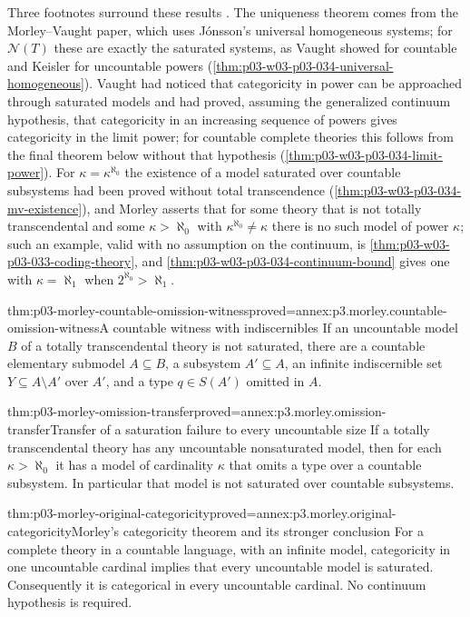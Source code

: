 Three footnotes surround these results \cite[p.~535, nn.~22--24]{Morley1965}.
The uniqueness theorem comes from the Morley--Vaught paper, which uses
Jónsson's universal homogeneous systems; for \(\mathcal N(T)\) these are
exactly the saturated systems, as Vaught showed for countable and Keisler
for uncountable powers (\cref{thm:p03-w03-p03-034-universal-homogeneous}).
Vaught had noticed that categoricity in power can be approached through
saturated models and had proved, assuming the generalized continuum
hypothesis, that categoricity in an increasing sequence of powers gives
categoricity in the limit power; for countable complete theories this
follows from the final theorem below without that hypothesis
(\cref{thm:p03-w03-p03-034-limit-power}). For \(\kappa=\kappa^{\aleph_0}\)
the existence of a model saturated over countable subsystems had been
proved without total transcendence
(\cref{thm:p03-w03-p03-034-mv-existence}), and Morley asserts that for
some theory that is not totally transcendental and some \(\kappa>\aleph_0\)
with \(\kappa^{\aleph_0}\neq\kappa\) there is no such model of power
\(\kappa\); such an example, valid with no assumption on the continuum,
is \cref{thm:p03-w03-p03-033-coding-theory}, and
\cref{thm:p03-w03-p03-034-continuum-bound} gives one with
\(\kappa=\aleph_1\) when \(2^{\aleph_0}>\aleph_1\).

\begin{hblemma}{thm:p03-morley-countable-omission-witness}{proved=annex:p3.morley.countable-omission-witness}{A countable witness with indiscernibles}
If an uncountable model \(B\) of a totally transcendental theory
is not saturated, there are a countable elementary submodel
\(A\subseteq B\), a subsystem \(A'\subseteq A\), an infinite
indiscernible set \(Y\subseteq A\setminus A'\) over \(A'\),
and a type \(q\in S(A')\) omitted in \(A\).
\end{hblemma}

\begin{hbtheorem}{thm:p03-morley-omission-transfer}{proved=annex:p3.morley.omission-transfer}{Transfer of a saturation failure to every uncountable size}
If a totally transcendental theory has any uncountable nonsaturated
model, then for each \(\kappa>\aleph_0\) it has a model of
cardinality \(\kappa\) that omits a type over a countable
subsystem. In particular that model is not saturated over
countable subsystems.
\end{hbtheorem}

\begin{hbtheorem}{thm:p03-morley-original-categoricity}{proved=annex:p3.morley.original-categoricity}{Morley's categoricity theorem and its stronger conclusion}
For a complete theory in a countable language, with an infinite
model, categoricity in one uncountable cardinal implies that
every uncountable model is saturated. Consequently it is
categorical in every uncountable cardinal. No continuum
hypothesis is required.
\end{hbtheorem}

